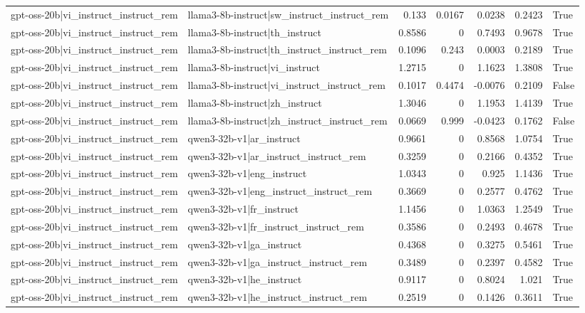 \begin{table}
\begin{tabular}{l l r r r r l}
gpt-oss-20b|vi_instruct_instruct_rem & llama3-8b-instruct|sw_instruct_instruct_rem & 0.133 & 0.0167 & 0.0238 & 0.2423 & True \\
gpt-oss-20b|vi_instruct_instruct_rem & llama3-8b-instruct|th_instruct & 0.8586 & 0 & 0.7493 & 0.9678 & True \\
gpt-oss-20b|vi_instruct_instruct_rem & llama3-8b-instruct|th_instruct_instruct_rem & 0.1096 & 0.243 & 0.0003 & 0.2189 & True \\
gpt-oss-20b|vi_instruct_instruct_rem & llama3-8b-instruct|vi_instruct & 1.2715 & 0 & 1.1623 & 1.3808 & True \\
gpt-oss-20b|vi_instruct_instruct_rem & llama3-8b-instruct|vi_instruct_instruct_rem & 0.1017 & 0.4474 & -0.0076 & 0.2109 & False \\
gpt-oss-20b|vi_instruct_instruct_rem & llama3-8b-instruct|zh_instruct & 1.3046 & 0 & 1.1953 & 1.4139 & True \\
gpt-oss-20b|vi_instruct_instruct_rem & llama3-8b-instruct|zh_instruct_instruct_rem & 0.0669 & 0.999 & -0.0423 & 0.1762 & False \\
gpt-oss-20b|vi_instruct_instruct_rem & qwen3-32b-v1|ar_instruct & 0.9661 & 0 & 0.8568 & 1.0754 & True \\
gpt-oss-20b|vi_instruct_instruct_rem & qwen3-32b-v1|ar_instruct_instruct_rem & 0.3259 & 0 & 0.2166 & 0.4352 & True \\
gpt-oss-20b|vi_instruct_instruct_rem & qwen3-32b-v1|eng_instruct & 1.0343 & 0 & 0.925 & 1.1436 & True \\
gpt-oss-20b|vi_instruct_instruct_rem & qwen3-32b-v1|eng_instruct_instruct_rem & 0.3669 & 0 & 0.2577 & 0.4762 & True \\
gpt-oss-20b|vi_instruct_instruct_rem & qwen3-32b-v1|fr_instruct & 1.1456 & 0 & 1.0363 & 1.2549 & True \\
gpt-oss-20b|vi_instruct_instruct_rem & qwen3-32b-v1|fr_instruct_instruct_rem & 0.3586 & 0 & 0.2493 & 0.4678 & True \\
gpt-oss-20b|vi_instruct_instruct_rem & qwen3-32b-v1|ga_instruct & 0.4368 & 0 & 0.3275 & 0.5461 & True \\
gpt-oss-20b|vi_instruct_instruct_rem & qwen3-32b-v1|ga_instruct_instruct_rem & 0.3489 & 0 & 0.2397 & 0.4582 & True \\
gpt-oss-20b|vi_instruct_instruct_rem & qwen3-32b-v1|he_instruct & 0.9117 & 0 & 0.8024 & 1.021 & True \\
gpt-oss-20b|vi_instruct_instruct_rem & qwen3-32b-v1|he_instruct_instruct_rem & 0.2519 & 0 & 0.1426 & 0.3611 & True \\

\end{tabular}
\end{table}
